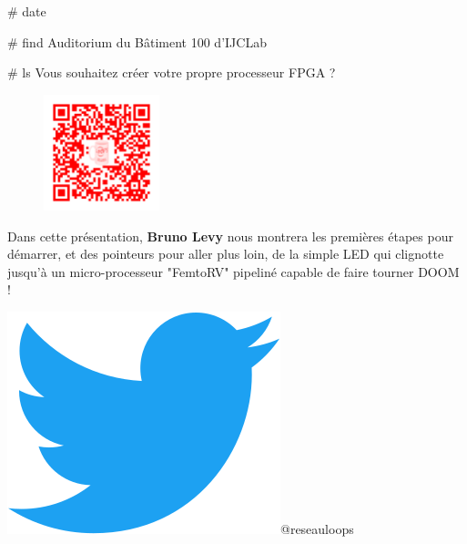 \documentclass[final]{beamer}
\newlength{\twocolwid}
\begin{document}
\begin{frame}[t]
\begin{columns}[t]
\begin{column}{\twocolwid}
\begin{block}{\# date}
\end{block}

\begin{block}{\# find}
     Auditorium du B\^{a}timent 100 d'IJCLab

    
\end{block}

\begin{block}{\# ls}
     Vous souhaitez cr\'{e}er votre propre processeur FPGA ?

\begin{figure}
    \centering
    \includegraphics[width=0.3\textwidth]{qrcode.png}
    \end{figure}

    Dans cette présentation, \textbf{Bruno Levy} nous montrera les premières étapes pour démarrer,
    et des pointeurs pour aller plus loin, de la simple LED qui clignotte jusqu'à un
    micro-processeur "FemtoRV" pipeliné capable de faire tourner DOOM !

\end{block}












\begin{alertblock}{\includegraphics[width=0.065\linewidth]{Twitter_Bird.png}@reseauloops}
\end{alertblock}


\end{column}
\end{columns}
\end{frame}
\end{document}
